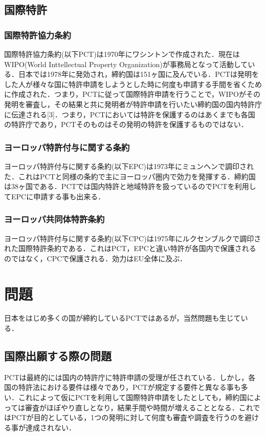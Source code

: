 \documentclass[11pt,a4paper]{jsarticle}
\begin{document}
  \subsection{国際特許}
   \subsubsection{国際特許協力条約}
   国際特許協力条約(以下PCT)は1970年にワシントンで作成された．現在はWIPO(World Inttellectual Property Organization)が事務局となって活動している．日本では1978年に発効され，締約国は151ヶ国に及んでいる．PCTは発明をした人が様々な国に特許申請をしようとした時に何度も申請する手間を省くために作成された．つまり，PCTに従って国際特許申請を行うことで，WIPOがその発明を審査し，その結果と共に発明者が特許申請を行いたい締約国の国内特許庁に伝達される[3]．つまり，PCTにおいては特許を保護するのはあくまでも各国の特許庁であり，PCTそのものはその発明の特許を保護するものではない．

   \subsubsection{ヨーロッパ特許付与に関する条約}
   ヨーロッパ特許付与に関する条約(以下EPC)は1973年にミュンヘンで調印された．これはPCTと同様の条約で主にヨーロッパ圏内で効力を発揮する．締約国は38ヶ国である．PCTでは国内特許と地域特許を扱っているのでPCTを利用してEPCに申請する事も出来る．
   
   \subsubsection{ヨーロッパ共同体特許条約}
   ヨーロッパ特許付与に関する条約(以下CPC)は1975年にルクセンブルクで調印された国際特許条約である．これはPCT，EPCと違い特許が各国内で保護されるのではなく，CPCで保護される．効力はEU全体に及ぶ．

 \section{問題}
 日本をはじめ多くの国が締約しているPCTではあるが，当然問題も生じている． 
  \subsection{国際出願する際の問題}
  PCTは最終的には国内の特許庁に特許申請の受理が任されている．しかし，各国の特許法における要件は様々であり，PCTが規定する要件と異なる事も多い．これによって仮にPCTを利用して国際特許申請をしたとしても，締約国によっては審査がほぼやり直しとなり，結果手間や時間が増えることとなる．これではPCTが目的としている，1つの発明に対して何度も審査や調査を行うのを避ける事が達成されない．
  
\end{document}
